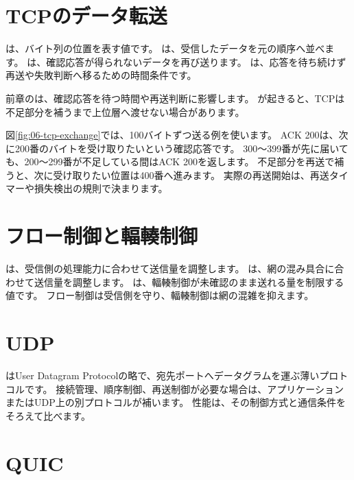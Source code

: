 \section{TCPのデータ転送}

は、バイト列の位置を表す値です。
は、受信したデータを元の順序へ並べます。
は、確認応答が得られないデータを再び送ります。
は、応答を待ち続けず再送や失敗判断へ移るための時間条件です。

前章のは、確認応答を待つ時間や再送判断に影響します。
が起きると、TCPは不足部分を補うまで上位層へ渡せない場合があります。

図\ref{fig:06-tcp-exchange}では、100バイトずつ送る例を使います。
ACK 200は、次に200番のバイトを受け取りたいという確認応答です。
300〜399番が先に届いても、200〜299番が不足している間はACK 200を返します。
不足部分を再送で補うと、次に受け取りたい位置は400番へ進みます。
実際の再送開始は、再送タイマーや損失検出の規則で決まります。


\section{フロー制御と輻輳制御}

は、受信側の処理能力に合わせて送信量を調整します。
は、網の混み具合に合わせて送信量を調整します。
は、輻輳制御が未確認のまま送れる量を制限する値です。
フロー制御は受信側を守り、輻輳制御は網の混雑を抑えます。

\section{UDP}

はUser Datagram Protocolの略で、宛先ポートへデータグラムを運ぶ薄いプロトコルです。
接続管理、順序制御、再送制御が必要な場合は、アプリケーションまたはUDP上の別プロトコルが補います。
性能は、その制御方式と通信条件をそろえて比べます。

\section{QUIC}

